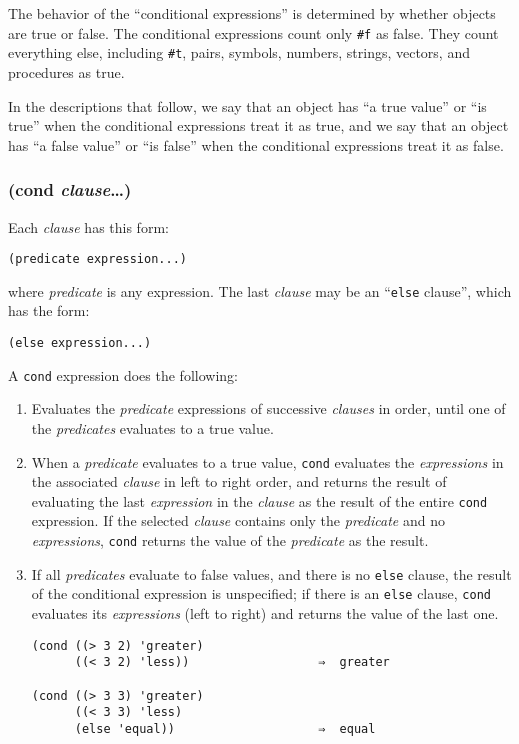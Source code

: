 \documentclass{article}
\begin{document}
The behavior of the ``conditional expressions'' is determined by whether objects are true or
false. The conditional expressions count only \verb|#f| as false. They count everything
else, including \verb|#t|, pairs, symbols, numbers, strings, vectors, and procedures as
true.

In the descriptions that follow, we say that an object has ``a true value'' or ``is true''
when the conditional expressions treat it as true, and we say that an object has ``a false
value'' or ``is false'' when the conditional expressions treat it as false.

\subsubsection{(cond \emph{clause}\ldots{})}

Each \emph{clause} has this form:

\begin{verbatim}(predicate expression...)
\end{verbatim}

where \emph{predicate} is any expression. The last \emph{clause} may be an ``\verb|else|
clause'', which has the form:

\begin{verbatim}(else expression...)
\end{verbatim}

A \verb|cond| expression does the following:

\begin{enumerate}
\item Evaluates the \emph{predicate} expressions of successive \emph{clauses} in order, until
  one of the \emph{predicates} evaluates to a true value.
\item When a \emph{predicate} evaluates to a true value, \verb|cond| evaluates the
  \emph{expressions} in the associated \emph{clause} in left to right order, and returns the
  result of evaluating the last \emph{expression} in the \emph{clause} as the result of the
  entire \verb|cond| expression. If the selected \emph{clause} contains only the
  \emph{predicate} and no \emph{expressions}, \verb|cond| returns the value of the
  \emph{predicate} as the result.
\item If all \emph{predicates} evaluate to false values, and there is no \verb|else| clause,
  the result of the conditional expression is unspecified; if there is an \verb|else|
  clause, \verb|cond| evaluates its \emph{expressions} (left to right) and returns the value
  of the last one.

\begin{verbatim}
(cond ((> 3 2) 'greater)
      ((< 3 2) 'less))                  ⇒  greater

(cond ((> 3 3) 'greater)
      ((< 3 3) 'less)
      (else 'equal))                    ⇒  equal
\end{verbatim}
\end{enumerate}
\end{document}
